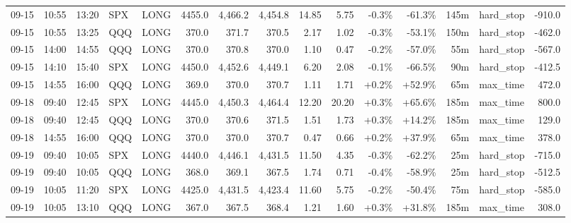 \documentclass[11pt,a4paper,twoside]{article}
\begin{document}
\begin{landscape}
\begin{center}
\begin{longtable}{>{\color{txtmain}}l l l l l r r r r r r r r >{\color{txtmain}}l r}
09-15 & 10:55 & 13:20 & SPX & LONG & 4455.0 & 4,466.2 & 4,454.8 & 14.85 & 5.75 & \textcolor{lossred}{-0.3\%} & \textcolor{lossred}{-61.3\%} & 145m & hard\_stop & \textcolor{lossred}{-910.0} \\
09-15 & 10:55 & 13:25 & QQQ & LONG & 370.0 & 371.7 & 370.5 & 2.17 & 1.02 & \textcolor{lossred}{-0.3\%} & \textcolor{lossred}{-53.1\%} & 150m & hard\_stop & \textcolor{lossred}{-462.0} \\
09-15 & 14:00 & 14:55 & QQQ & LONG & 370.0 & 370.8 & 370.0 & 1.10 & 0.47 & \textcolor{lossred}{-0.2\%} & \textcolor{lossred}{-57.0\%} & 55m & hard\_stop & \textcolor{lossred}{-567.0} \\
09-15 & 14:10 & 15:40 & SPX & LONG & 4450.0 & 4,452.6 & 4,449.1 & 6.20 & 2.08 & \textcolor{lossred}{-0.1\%} & \textcolor{lossred}{-66.5\%} & 90m & hard\_stop & \textcolor{lossred}{-412.5} \\
09-15 & 14:55 & 16:00 & QQQ & LONG & 369.0 & 370.0 & 370.7 & 1.11 & 1.71 & \textcolor{wingreen}{+0.2\%} & \textcolor{wingreen}{+52.9\%} & 65m & max\_time & \textcolor{wingreen}{472.0} \\
09-18 & 09:40 & 12:45 & SPX & LONG & 4445.0 & 4,450.3 & 4,464.4 & 12.20 & 20.20 & \textcolor{wingreen}{+0.3\%} & \textcolor{wingreen}{+65.6\%} & 185m & max\_time & \textcolor{wingreen}{800.0} \\
09-18 & 09:40 & 12:45 & QQQ & LONG & 370.0 & 370.6 & 371.5 & 1.51 & 1.73 & \textcolor{wingreen}{+0.3\%} & \textcolor{wingreen}{+14.2\%} & 185m & max\_time & \textcolor{wingreen}{129.0} \\
09-18 & 14:55 & 16:00 & QQQ & LONG & 370.0 & 370.0 & 370.7 & 0.47 & 0.66 & \textcolor{wingreen}{+0.2\%} & \textcolor{wingreen}{+37.9\%} & 65m & max\_time & \textcolor{wingreen}{378.0} \\
09-19 & 09:40 & 10:05 & SPX & LONG & 4440.0 & 4,446.1 & 4,431.5 & 11.50 & 4.35 & \textcolor{lossred}{-0.3\%} & \textcolor{lossred}{-62.2\%} & 25m & hard\_stop & \textcolor{lossred}{-715.0} \\
09-19 & 09:40 & 10:05 & QQQ & LONG & 368.0 & 369.1 & 367.5 & 1.74 & 0.71 & \textcolor{lossred}{-0.4\%} & \textcolor{lossred}{-58.9\%} & 25m & hard\_stop & \textcolor{lossred}{-512.5} \\
09-19 & 10:05 & 11:20 & SPX & LONG & 4425.0 & 4,431.5 & 4,423.4 & 11.60 & 5.75 & \textcolor{lossred}{-0.2\%} & \textcolor{lossred}{-50.4\%} & 75m & hard\_stop & \textcolor{lossred}{-585.0} \\
09-19 & 10:05 & 13:10 & QQQ & LONG & 367.0 & 367.5 & 368.4 & 1.21 & 1.60 & \textcolor{wingreen}{+0.3\%} & \textcolor{wingreen}{+31.8\%} & 185m & max\_time & \textcolor{wingreen}{308.0} \\

\end{longtable}
\end{center}
\end{landscape}
\end{document}
